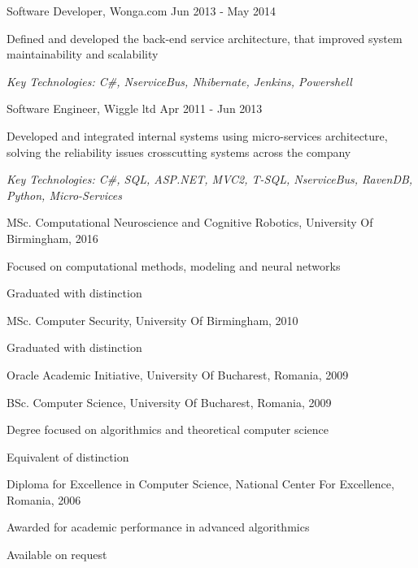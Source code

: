 \documentclass[11pt,article,oneside]{memoir}
\newenvironment{itemize*}{%
  \renewcommand\labelitemi{\textbullet}
  \footnotesize
  \begin{itemize}%
    \setlength{\itemsep}{0pt}}%
  {\end{itemize}
}
\begin{document}
\normalsize
\medskip
\ind Software Developer, Wonga.com \hfill Jun 2013 - May 2014
\begin{itemize*}
  \item Defined and developed the back-end service architecture, that improved system maintainability and scalability
\end{itemize*}
\ind \hspace{0.35in} \footnotesize \emph{Key Technologies: C\#, NserviceBus, Nhibernate, Jenkins, Powershell}

\normalsize
\medskip
\ind Software Engineer, Wiggle ltd \hfill Apr 2011 - Jun 2013
\begin{itemize*}
  \item Developed and integrated internal systems using micro-services architecture, solving the reliability issues crosscutting systems across the company 
\end{itemize*}
\ind \hspace{0.35in} \footnotesize \emph{Key Technologies: C\#, SQL, ASP.NET, MVC2, T-SQL, NserviceBus, RavenDB, Python, Micro-Services}

\normalsize
\bigskip
{}

\ind MSc. Computational Neuroscience and Cognitive Robotics, University Of Birmingham, \hfill 2016

\ind \hspace{0.35in} \footnotesize Focused on computational methods, modeling and neural networks \normalsize

\ind \hspace{0.35in} \footnotesize Graduated with distinction \normalsize

\ind MSc. Computer Security, University Of Birmingham, \hfill 2010

\ind \hspace{0.35in} \footnotesize Graduated with distinction \normalsize

\ind Oracle Academic Initiative, University Of Bucharest, Romania, \hfill 2009

\ind BSc. Computer Science, University Of Bucharest, Romania, \hfill 2009

\ind \hspace{0.35in} \footnotesize Degree focused on algorithmics and theoretical computer science\normalsize

\ind \hspace{0.35in} \footnotesize Equivalent of distinction \normalsize

\ind Diploma for Excellence in Computer Science, National Center For Excellence, Romania, \hfill 2006

\ind \hspace{0.35in} \footnotesize Awarded for academic performance in advanced algorithmics \normalsize

\normalsize
\bigskip
{}

\ind Available on request
\end{document}
